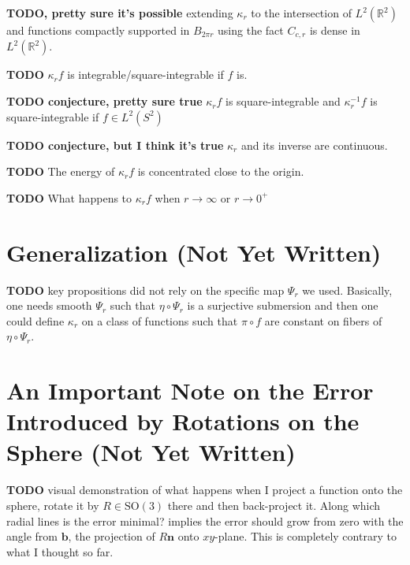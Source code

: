 \documentclass[a4paper,11pt]{scrartcl}
\numberwithin{dummy}{section}
\theoremstyle{plain}
\theoremstyle{plain}
\theoremstyle{plain}
\theoremstyle{plain}
\theoremstyle{nonumberplain}
\newcommand{\F}[1][R]{\mathbb{#1}} %
\newcommand{\SO}{\mathrm{SO}}
\begin{document}
	\textbf{TODO, pretty sure it's possible} extending $ \kappa_{r} $ to the intersection of $ L^{2} (\F^{2}) $ and functions compactly supported in $ B_{2 \pi r} $ using the fact $ C_{c,r} $ is dense in $ L^{2} (\F^{2}) $.
	
	\textbf{TODO} $ \kappa_{r} f $ is integrable/square-integrable if $ f $ is.
	
	\textbf{TODO conjecture, pretty sure true} $ \kappa_{r} f $ is square-integrable and $ \kappa_{r}^{-1} f $ is square-integrable if $ f \in L^{2} (S^{2}) $
	
	\textbf{TODO conjecture, but I think it's true} $ \kappa_{r} $ and its inverse are continuous.
	
	\textbf{TODO} The energy of $ \kappa_{r} f $ is concentrated close to the origin.
	
	\textbf{TODO} What happens to $ \kappa_{r} f $ when $ r \to \infty $ or $ r \to 0^{+} $
	
	\section{Generalization (Not Yet Written)}
	\textbf{TODO} key propositions did not rely on the specific map $ \Psi_{r} $ we used. Basically, one needs smooth $ \Psi_{r} $ such that $ \eta \circ \Psi_{r} $ is a surjective submersion and then one could define $ \kappa_{r} $ on a class of functions such that $ \pi \circ f $ are constant on fibers of $ \eta \circ \Psi_{r} $.
	
	\appendix
	\section{An Important Note on the Error Introduced by Rotations on the Sphere (Not Yet Written)}
	\textbf{TODO} visual demonstration of what happens when I project a function onto the sphere, rotate it by $ R \in \SO(3) $ there and then back-project it. Along which radial lines is the error minimal?  implies the error should grow from zero with the angle from $ \mathbf{b} $, the projection of $ R \mathbf{n} $ onto $ xy $-plane. This is completely contrary to what I thought so far.
	
	\printbibliography
	
\end{document}
